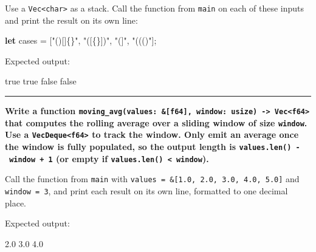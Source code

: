 \documentclass[
  11pt,
]{article}
\newenvironment{Shaded}{}{}
\newcommand{\KeywordTok}[1]{\textcolor[rgb]{0.00,0.44,0.13}{\textbf{#1}}}
\newcommand{\NormalTok}[1]{#1}
\newcommand{\OperatorTok}[1]{\textcolor[rgb]{0.40,0.40,0.40}{#1}}
\newcommand{\StringTok}[1]{\textcolor[rgb]{0.25,0.44,0.63}{#1}}
\begin{document}
Use a \texttt{Vec\textless{}char\textgreater{}} as a stack. Call the
function from \texttt{main} on each of these inputs and print the result
on its own line:

\begin{Shaded}
\begin{Highlighting}[]
\KeywordTok{let}\NormalTok{ cases }\OperatorTok{=}\NormalTok{ [}\StringTok{"()[]\{\}"}\OperatorTok{,} \StringTok{"([\{\}])"}\OperatorTok{,} \StringTok{"(]"}\OperatorTok{,} \StringTok{"((()"}\NormalTok{]}\OperatorTok{;}
\end{Highlighting}
\end{Shaded}

Expected output:

\begin{Shaded}
\begin{Highlighting}[]
\NormalTok{true}
\NormalTok{true}
\NormalTok{false}
\NormalTok{false}
\end{Highlighting}
\end{Shaded}

\begin{Shaded}
\begin{Highlighting}[]


\end{Highlighting}
\end{Shaded}

\begin{center}\rule{0.5\linewidth}{0.5pt}\end{center}

\textbf{Write a function
\texttt{moving\_avg(values:\ \&{[}f64{]},\ window:\ usize)\ -\textgreater{}\ Vec\textless{}f64\textgreater{}}
that computes the rolling average over a sliding window of size
\texttt{window}. Use a \texttt{VecDeque\textless{}f64\textgreater{}} to
track the window. Only emit an average once the window is fully
populated, so the output length is
\texttt{values.len()\ -\ window\ +\ 1} (or empty if
\texttt{values.len()\ \textless{}\ window}).}

Call the function from \texttt{main} with
\texttt{values\ =\ \&{[}1.0,\ 2.0,\ 3.0,\ 4.0,\ 5.0{]}} and
\texttt{window\ =\ 3}, and print each result on its own line, formatted
to one decimal place.

Expected output:

\begin{Shaded}
\begin{Highlighting}[]
\NormalTok{2.0}
\NormalTok{3.0}
\NormalTok{4.0}
\end{Highlighting}
\end{Shaded}
\end{document}
